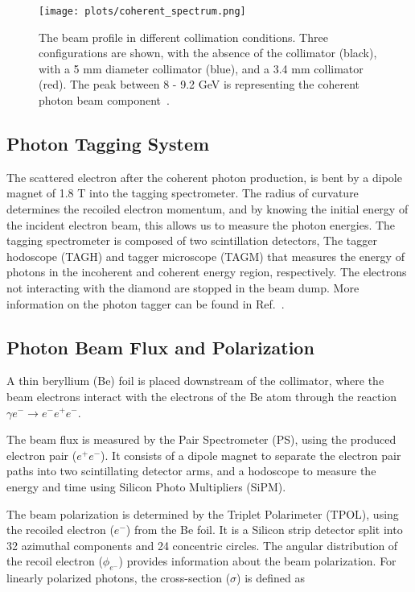 \begin{figure}[H]
    \centering
        \texttt{[image: plots/coherent\_spectrum.png]}
        \caption{The beam profile in different collimation conditions. Three configurations are shown, with the absence of the collimator (black), with a 5 mm diameter collimator (blue), and a 3.4 mm collimator (red). The peak between 8 - 9.2 GeV is representing the coherent photon beam component~\cite{31}.}
        \label{fig.2.1.1}
\end{figure}

\subsection{Photon Tagging System}
\label{p.2.1.2}

The scattered electron after the coherent photon production, is bent by a dipole magnet of 1.8 T into the tagging spectrometer. The radius of curvature determines the recoiled electron momentum, and by knowing the initial energy of the incident electron beam, this allows us to measure the photon energies. The tagging spectrometer is composed of two scintillation detectors, The tagger hodoscope (TAGH) and tagger microscope (TAGM) that measures the energy of photons in the incoherent and coherent energy region, respectively. The electrons not interacting with the diamond are stopped in the beam dump. More information on the photon tagger can be found in Ref.~\cite{31}.

\subsection{Photon Beam Flux and Polarization}
\label{p.2.1.3}

A thin beryllium (Be) foil is placed downstream of the collimator, where the beam electrons interact with the electrons of the Be atom through the reaction $\gamma e^- \rightarrow e^-e^+e^-$.
~\par The beam flux is measured by the Pair Spectrometer (PS), using the produced electron pair ($e^+e^-$). It consists of a dipole magnet to separate the electron pair paths into two scintillating detector arms, and a hodoscope to measure the energy and time using Silicon Photo Multipliers (SiPM).
~\par The beam polarization is determined by the Triplet Polarimeter (TPOL), using the recoiled electron ($e^-$) from the Be foil. It is a Silicon strip detector split into 32 azimuthal components and 24 concentric circles. The angular distribution of the recoil electron ($\phi_{e^-}$) provides information about the beam polarization. For linearly polarized photons, the cross-section ($\sigma$) is defined as

